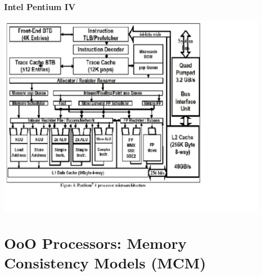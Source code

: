 \documentclass{beamer}
\begin{document}
\begin{frame}[fragile,t]
\frametitle{Intel Pentium IV}

\includegraphics[width=70ex]{FigsOoOProc/Pentium4Arch.pdf}

\end{frame}

\section{OoO Processors: Memory Consistency Models (MCM)}

\begin{frame}[fragile]
	\tableofcontents[currentsection]
\end{frame}
\end{document}
